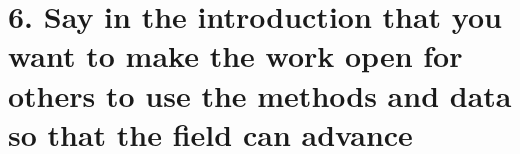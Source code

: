 \documentclass[12pt]{article}
\begin{document}
%
%
%
%
%
%

\section*{6. 
Say in the introduction that you want to make
the work open for others to use the methods 
and data so that the field can advance
}
\end{document}
